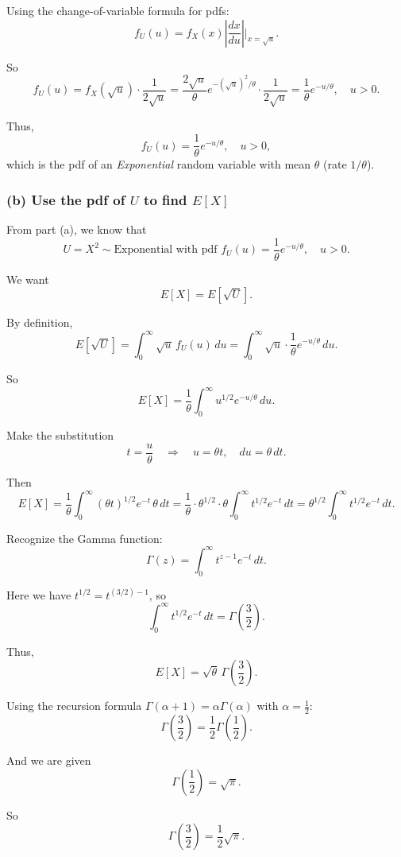 \documentclass[11pt,letterpaper]{article}
\theoremstyle{remark}
\begin{document}
Using the change-of-variable formula for pdfs:
\[
f_U(u) = f_X(x) \left|\frac{dx}{du}\right| \bigg|_{x = \sqrt{u}}.
\]

So
\[
f_U(u)
= f_X(\sqrt{u}) \cdot \frac{1}{2\sqrt{u}}
= \frac{2\sqrt{u}}{\theta} e^{-(\sqrt{u})^2/\theta} \cdot \frac{1}{2\sqrt{u}}
= \frac{1}{\theta} e^{-u/\theta}, \quad u > 0.
\]

Thus,
\[
\boxed{
f_U(u) = \frac{1}{\theta} e^{-u/\theta}, \quad u > 0,
}
\]
which is the pdf of an \emph{Exponential} random variable with mean $\theta$ (rate $1/\theta$).

\medskip

\subsubsection*{(b) Use the pdf of $U$ to find $E[X]$}

From part (a), we know that
\[
U = X^2 \sim \text{Exponential with pdf } f_U(u) = \frac{1}{\theta} e^{-u/\theta}, \quad u > 0.
\]

We want
\[
E[X] = E[\sqrt{U}].
\]

By definition,
\[
E[\sqrt{U}] = \int_0^\infty \sqrt{u} \, f_U(u)\,du
= \int_0^\infty \sqrt{u} \cdot \frac{1}{\theta} e^{-u/\theta}\,du.
\]

So
\[
E[X]
= \frac{1}{\theta} \int_0^\infty u^{1/2} e^{-u/\theta} \, du.
\]

Make the substitution
\[
t = \frac{u}{\theta} \quad \Longrightarrow \quad u = \theta t, \quad du = \theta\, dt.
\]

Then
\[
E[X]
= \frac{1}{\theta} \int_0^\infty (\theta t)^{1/2} e^{-t} \, \theta\, dt
= \frac{1}{\theta} \cdot \theta^{1/2} \cdot \theta \int_0^\infty t^{1/2} e^{-t} \, dt
= \theta^{1/2} \int_0^\infty t^{1/2} e^{-t} \, dt.
\]

Recognize the Gamma function:
\[
\Gamma(z) = \int_0^\infty t^{z-1} e^{-t}\,dt.
\]

Here we have $t^{1/2} = t^{(3/2)-1}$, so
\[
\int_0^\infty t^{1/2} e^{-t} \, dt = \Gamma\left(\frac{3}{2}\right).
\]

Thus,
\[
E[X] = \sqrt{\theta} \, \Gamma\left(\frac{3}{2}\right).
\]

Using the recursion formula $\Gamma(\alpha + 1) = \alpha \Gamma(\alpha)$ with $\alpha = \tfrac{1}{2}$:
\[
\Gamma\left(\frac{3}{2}\right)
= \frac{1}{2} \Gamma\left(\frac{1}{2}\right).
\]

And we are given
\[
\Gamma\left(\frac{1}{2}\right) = \sqrt{\pi}.
\]

So
\[
\Gamma\left(\frac{3}{2}\right) = \frac{1}{2} \sqrt{\pi}.
\]
\end{document}
